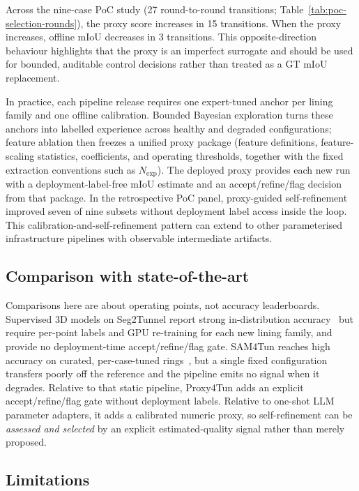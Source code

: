 \documentclass[a4paper,fleqn]{cas-dc}
\begin{document}
{Across the nine-case PoC study (27 round-to-round transitions; Table~\ref{tab:poc-selection-rounds}), the proxy score increases in 15 transitions. When the proxy increases, offline mIoU decreases in 3 transitions. This opposite-direction behaviour highlights that the proxy is an imperfect surrogate and should be used for bounded, auditable control decisions rather than treated as a GT mIoU replacement.

In practice, each pipeline release requires one expert-tuned anchor per
lining family and one offline calibration. Bounded Bayesian exploration turns
these anchors into labelled experience across healthy and degraded
configurations; feature ablation then freezes a unified proxy package
(feature definitions, feature-scaling statistics, coefficients, and operating thresholds, together with the fixed extraction conventions such as $N_{\mathrm{exp}}$). The deployed
proxy provides each new run with a deployment-label-free mIoU estimate and an accept/refine/flag decision from that package. In the retrospective PoC panel, proxy-guided self-refinement improved seven of nine subsets without deployment label access inside the loop. This calibration-and-self-refinement pattern can extend to other parameterised infrastructure pipelines with observable intermediate artifacts.

\subsection{Comparison with state-of-the-art}\label{sec:positioning}

Comparisons here are about operating points, not accuracy leaderboards. Supervised 3D models on Seg2Tunnel report strong in-distribution accuracy~\cite{lin2024seg2tunnel} but require per-point labels and GPU re-training for each new lining family, and provide no deployment-time accept/refine/flag gate. SAM4Tun reaches high accuracy on curated, per-case-tuned rings~\cite{ye2025sam4tun}, but a single fixed configuration transfers poorly off the reference and the pipeline emits no signal when it degrades. Relative to that static pipeline, Proxy4Tun adds an explicit accept/refine/flag gate without deployment labels. Relative to one-shot LLM parameter adapters, it adds a calibrated numeric proxy, so self-refinement can be \emph{assessed and selected} by an explicit estimated-quality signal rather than merely proposed.

\subsection{Limitations}\label{sec:limitations}

}
\end{document}
